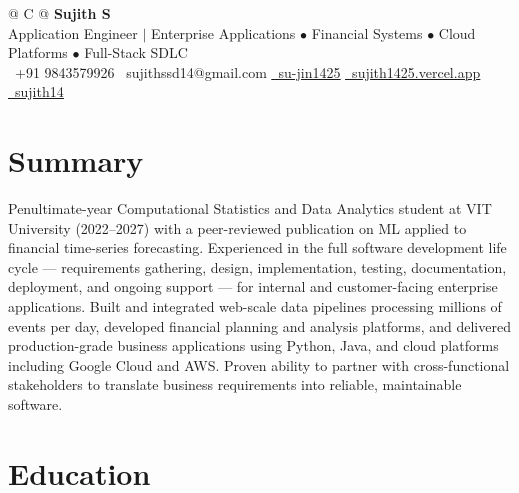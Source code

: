\documentclass[a4paper,10pt]{article}
\newcommand{\ulink}[2]{\href{#1}{\uline{#2}}}
\begin{document}
\pagestyle{empty}

\begin{tabularx}{\linewidth}{@{} C @{}}
  {\color[HTML]{000000}\fontsize{30}{35}\selectfont\bfseries Sujith S} \\[5pt]
  {\fontsize{10.5}{12.5}\selectfont\color[HTML]{3A3A3A}Application Engineer $|$ Enterprise Applications $\bullet$ Financial Systems $\bullet$ Cloud Platforms $\bullet$ Full-Stack SDLC} \\[6pt]
  {\fontsize{10.5}{12.5}\selectfont
    \textcolor[HTML]{3A3A3A}{%
    {}\ +91 9843579926
    \quad
    {\faEnvelope}\ sujithssd14@gmail.com
    \quad
    \ulink{https://github.com/su-jin1425}{{\faGithub}\ su-jin1425}
    \quad
    \ulink{https://sujith1425.vercel.app}{{\faGlobe}\ sujith1425.vercel.app}
    \quad
    \ulink{https://linkedin.com/in/sujith14}{{\faLinkedin}\ sujith14}
    }
}
\end{tabularx}

\vspace{2pt}

\section{Summary}
\vspace{2pt}
{\color[HTML]{0A0A0A}\fontsize{11}{14}\selectfont
Penultimate-year Computational Statistics and Data Analytics student at VIT University (2022--2027) with a peer-reviewed publication on ML applied to financial time-series forecasting. Experienced in the full software development life cycle --- requirements gathering, design, implementation, testing, documentation, deployment, and ongoing support --- for internal and customer-facing enterprise applications. Built and integrated web-scale data pipelines processing millions of events per day, developed financial planning and analysis platforms, and delivered production-grade business applications using Python, Java, and cloud platforms including Google Cloud and AWS. Proven ability to partner with cross-functional stakeholders to translate business requirements into reliable, maintainable software.
}

\vspace{2pt}

\section{Education}
\vspace{2pt}
\end{document}
